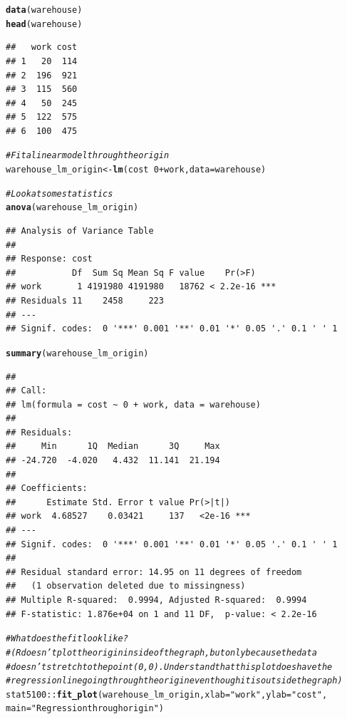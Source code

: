 \documentclass{article}\usepackage[]{graphicx}\usepackage[]{color}
\makeatletter
\newcommand{\hlnum}[1]{\textcolor[rgb]{0.686,0.059,0.569}{#1}}%
\newcommand{\hlstr}[1]{\textcolor[rgb]{0.192,0.494,0.8}{#1}}%
\newcommand{\hlcom}[1]{\textcolor[rgb]{0.678,0.584,0.686}{\textit{#1}}}%
\newcommand{\hlopt}[1]{\textcolor[rgb]{0,0,0}{#1}}%
\newcommand{\hlstd}[1]{\textcolor[rgb]{0.345,0.345,0.345}{#1}}%
\newcommand{\hlkwb}[1]{\textcolor[rgb]{0.69,0.353,0.396}{#1}}%
\newcommand{\hlkwc}[1]{\textcolor[rgb]{0.333,0.667,0.333}{#1}}%
\newcommand{\hlkwd}[1]{\textcolor[rgb]{0.737,0.353,0.396}{\textbf{#1}}}%
\newenvironment{kframe}{%
 \def\at@end@of@kframe{}%
 \ifinner\ifhmode%
  \def\at@end@of@kframe{\end{minipage}}%
  \begin{minipage}{\columnwidth}%
 \fi\fi%
 \def\FrameCommand##1{\hskip\@totalleftmargin \hskip-\fboxsep
 \colorbox{shadecolor}{##1}\hskip-\fboxsep
     \hskip-\linewidth \hskip-\@totalleftmargin \hskip\columnwidth}%
 \MakeFramed {\advance\hsize-\width
   \@totalleftmargin\z@ \linewidth\hsize
   \@setminipage}}%
 {\par\unskip\endMakeFramed%
 \at@end@of@kframe}
\newenvironment{knitrout}{}{} %
\makeatother
\begin{document}
\begin{knitrout}
\color{fgcolor}\begin{kframe}
\begin{alltt}
\hlkwd{data}\hlstd{(warehouse)}
\hlkwd{head}\hlstd{(warehouse)}
\end{alltt}
\begin{verbatim}
##   work cost
## 1   20  114
## 2  196  921
## 3  115  560
## 4   50  245
## 5  122  575
## 6  100  475
\end{verbatim}
\begin{alltt}
\hlcom{# Fit a linear model through the origin}
\hlstd{warehouse_lm_origin} \hlkwb{<-} \hlkwd{lm}\hlstd{(cost} \hlopt{~} \hlnum{0} \hlopt{+} \hlstd{work,} \hlkwc{data} \hlstd{= warehouse)}

\hlcom{# Look at some statistics}
\hlkwd{anova}\hlstd{(warehouse_lm_origin)}
\end{alltt}
\begin{verbatim}
## Analysis of Variance Table
## 
## Response: cost
##           Df  Sum Sq Mean Sq F value    Pr(>F)    
## work       1 4191980 4191980   18762 < 2.2e-16 ***
## Residuals 11    2458     223                      
## ---
## Signif. codes:  0 '***' 0.001 '**' 0.01 '*' 0.05 '.' 0.1 ' ' 1
\end{verbatim}
\begin{alltt}
\hlkwd{summary}\hlstd{(warehouse_lm_origin)}
\end{alltt}
\begin{verbatim}
## 
## Call:
## lm(formula = cost ~ 0 + work, data = warehouse)
## 
## Residuals:
##     Min      1Q  Median      3Q     Max 
## -24.720  -4.020   4.432  11.141  21.194 
## 
## Coefficients:
##      Estimate Std. Error t value Pr(>|t|)    
## work  4.68527    0.03421     137   <2e-16 ***
## ---
## Signif. codes:  0 '***' 0.001 '**' 0.01 '*' 0.05 '.' 0.1 ' ' 1
## 
## Residual standard error: 14.95 on 11 degrees of freedom
##   (1 observation deleted due to missingness)
## Multiple R-squared:  0.9994,	Adjusted R-squared:  0.9994 
## F-statistic: 1.876e+04 on 1 and 11 DF,  p-value: < 2.2e-16
\end{verbatim}
\begin{alltt}
\hlcom{# What does the fit look like?}
\hlcom{# (R doesn't plot the origin inside of the graph, but only because the data}
\hlcom{# doesn't stretch to the point (0,0). Understand that this plot does have the}
\hlcom{# regression line going through the origin even though it is outside the graph)}
\hlstd{stat5100}\hlopt{::}\hlkwd{fit_plot}\hlstd{(warehouse_lm_origin,} \hlkwc{xlab} \hlstd{=} \hlstr{"work"}\hlstd{,} \hlkwc{ylab} \hlstd{=} \hlstr{"cost"}\hlstd{,}
                   \hlkwc{main} \hlstd{=} \hlstr{"Regression through origin"}\hlstd{)}
\end{alltt}
\end{kframe}


\end{knitrout}
\end{document}
